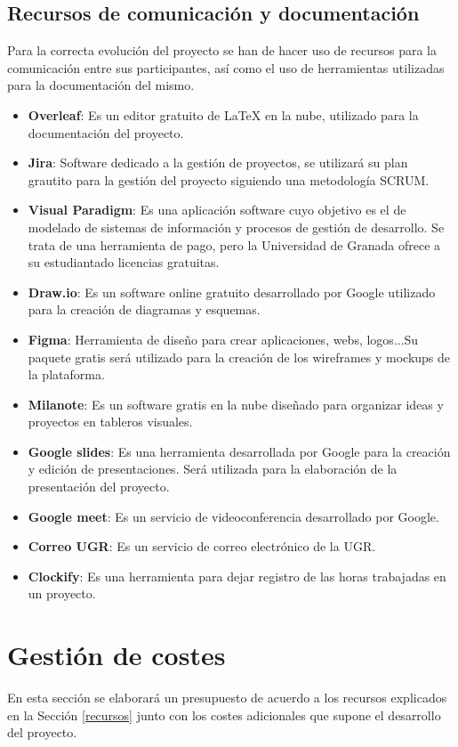 \subsection{Recursos  de comunicación y documentación}
Para la correcta evolución del proyecto se han de hacer uso de recursos para la comunicación entre sus participantes, así como el uso de herramientas utilizadas para la documentación del mismo.

\begin{itemize}
    \item \textbf{Overleaf}: Es un editor gratuito de LaTeX en la nube, utilizado para la documentación del proyecto.
    \item \textbf{Jira}: Software dedicado a la gestión de proyectos, se utilizará su plan grautito para la gestión del proyecto siguiendo una metodología SCRUM.
    \item \textbf{Visual Paradigm}: Es una aplicación software cuyo objetivo es el de modelado de sistemas de información y procesos de gestión de desarrollo. Se trata de una herramienta de pago, pero la Universidad de Granada ofrece a su estudiantado licencias gratuitas.
    \item \textbf{Draw.io}: Es un software online gratuito desarrollado por Google utilizado para la creación de diagramas y esquemas.
    \item \textbf{Figma}: Herramienta de diseño para crear aplicaciones, webs, logos...Su paquete gratis será utilizado para la creación de los wireframes y mockups de la plataforma.
    \item \textbf{Milanote}: Es un software gratis en la nube diseñado para organizar ideas y proyectos en tableros visuales.
    \item \textbf{Google slides}: Es una herramienta desarrollada por Google para la creación y edición de presentaciones. Será utilizada para la elaboración de la presentación del proyecto.
    \item \textbf{Google meet}: Es un servicio de videoconferencia desarrollado por Google.
    \item \textbf{Correo UGR}: Es un servicio de correo electrónico de la UGR.
    \item \textbf{Clockify}: Es una herramienta para dejar registro de las horas trabajadas en un proyecto.
\end{itemize}

\section{Gestión de costes}
En esta sección se elaborará un presupuesto de acuerdo a los recursos explicados en la Sección \ref{recursos} junto con los costes adicionales que supone el desarrollo del proyecto.

